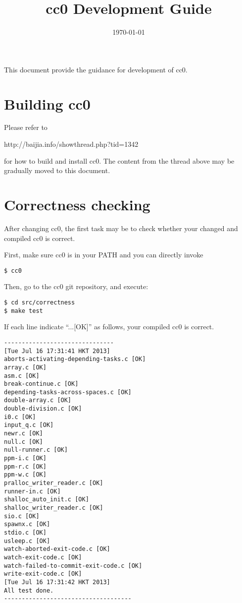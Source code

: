 \documentclass[10pt]{article}
\title{cc0 Development Guide}
\author{
}
\date{\today}
\begin{document}
This document provide the guidance for development of cc0.

\section{Building cc0}

Please refer to

http://baijia.info/showthread.php?tid=1342

for how to build and install cc0. The content from the thread above may be gradually moved to this document.

\section{Correctness checking}

After changing cc0, the first task may be to check whether your changed and compiled cc0 is correct.

First, make sure cc0 is in your PATH and you can directly invoke

\begin{verbatim}
$ cc0
\end{verbatim}

Then, go to the cc0 git repository, and execute:

\begin{verbatim}
$ cd src/correctness
$ make test
\end{verbatim}

If each line indicate ``...[OK]'' as follows, your compiled cc0 is correct.

\begin{verbatim}
-------------------------------
[Tue Jul 16 17:31:41 HKT 2013] 
aborts-activating-depending-tasks.c [OK]
array.c [OK]
asm.c [OK]
break-continue.c [OK]
depending-tasks-across-spaces.c [OK]
double-array.c [OK]
double-division.c [OK]
i0.c [OK]
input_q.c [OK]
newr.c [OK]
null.c [OK]
null-runner.c [OK]
ppm-i.c [OK]
ppm-r.c [OK]
ppm-w.c [OK]
pralloc_writer_reader.c [OK]
runner-in.c [OK]
shalloc_auto_init.c [OK]
shalloc_writer_reader.c [OK]
sio.c [OK]
spawnx.c [OK]
stdio.c [OK]
usleep.c [OK]
watch-aborted-exit-code.c [OK]
watch-exit-code.c [OK]
watch-failed-to-commit-exit-code.c [OK]
write-exit-code.c [OK]
[Tue Jul 16 17:31:42 HKT 2013] 
All test done.
------------------------------------
\end{verbatim}

\maketitle
\end{document}
